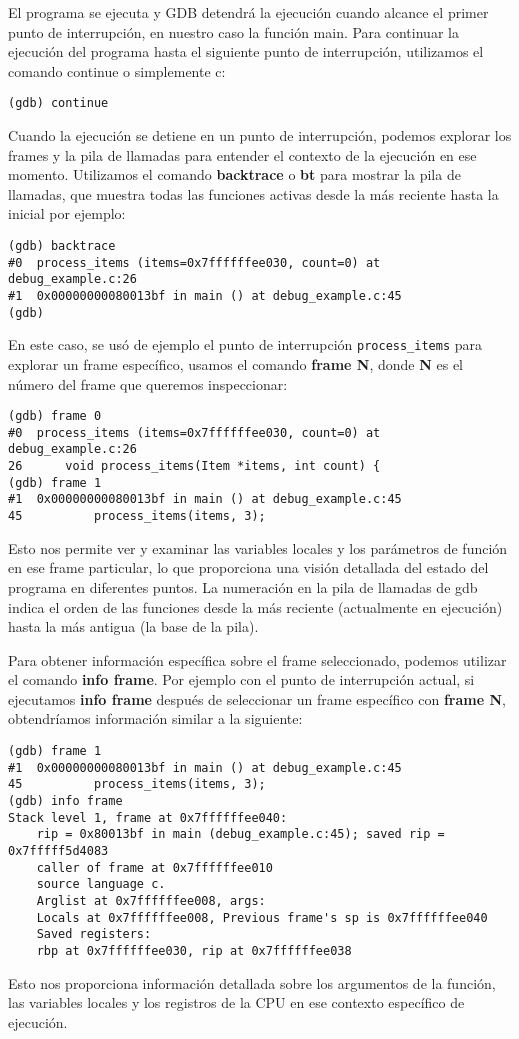 \documentclass[12pt,a4paper]{article}
\begin{document}
El programa se ejecuta y GDB detendrá la ejecución cuando alcance el primer punto de interrupción, en nuestro caso la función main. Para continuar la ejecución del programa hasta el siguiente punto de interrupción, utilizamos el comando continue o simplemente c:
\begin{verbatim}
(gdb) continue	
\end{verbatim}
Cuando la ejecución se detiene en un punto de interrupción, podemos explorar los frames y la pila de llamadas para entender el contexto de la ejecución en ese momento. Utilizamos el comando \textbf{backtrace} o \textbf{bt} para mostrar la pila de llamadas, que muestra todas las funciones activas desde la más reciente hasta la inicial por ejemplo:
\begin{verbatim}
(gdb) backtrace 
#0  process_items (items=0x7ffffffee030, count=0) at debug_example.c:26
#1  0x00000000080013bf in main () at debug_example.c:45
(gdb)
\end{verbatim}
En este caso, se usó de ejemplo el punto de interrupción \texttt{process\_items} para explorar un frame específico, usamos el comando \textbf{frame N}, donde \textbf{N} es el número del frame que queremos inspeccionar:
\begin{verbatim}
(gdb) frame 0
#0  process_items (items=0x7ffffffee030, count=0) at debug_example.c:26
26      void process_items(Item *items, int count) {
(gdb) frame 1
#1  0x00000000080013bf in main () at debug_example.c:45
45          process_items(items, 3);	
\end{verbatim}
Esto nos permite ver y examinar las variables locales y los parámetros de función en ese frame particular, lo que proporciona una visión detallada del estado del programa en diferentes puntos.
La numeración en la pila de llamadas de gdb indica el orden de las funciones desde la más reciente (actualmente en ejecución) hasta la más antigua (la base de la pila). 

Para obtener información específica sobre el frame seleccionado, podemos utilizar el comando \textbf{info frame}.
Por ejemplo con el punto de interrupción actual, si ejecutamos \textbf{info frame} después de seleccionar un frame específico con \textbf{frame N}, obtendríamos información similar a la siguiente:
\begin{verbatim}
(gdb) frame 1
#1  0x00000000080013bf in main () at debug_example.c:45
45          process_items(items, 3);
(gdb) info frame
Stack level 1, frame at 0x7ffffffee040:
	rip = 0x80013bf in main (debug_example.c:45); saved rip = 0x7fffff5d4083
	caller of frame at 0x7ffffffee010
	source language c.
	Arglist at 0x7ffffffee008, args:
	Locals at 0x7ffffffee008, Previous frame's sp is 0x7ffffffee040
	Saved registers:
	rbp at 0x7ffffffee030, rip at 0x7ffffffee038
\end{verbatim}
Esto nos proporciona información detallada sobre los argumentos de la función, las variables locales y los registros de la CPU en ese contexto específico de ejecución.
\end{document}
